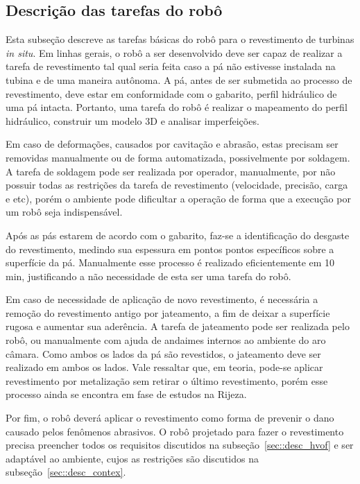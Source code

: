 \subsection{Descrição das tarefas do robô}
\label{desc_taref}
Esta subseção descreve as tarefas básicas do robô para o revestimento de
turbinas \textit{in situ}. Em linhas gerais, o robô a ser desenvolvido deve ser
capaz de realizar a tarefa de revestimento tal qual seria feita caso a pá não estivesse instalada na
tubina e de uma maneira autônoma. A pá, antes de ser submetida ao
processo de revestimento, deve estar em conformidade com o gabarito, perfil hidráulico de uma pá
intacta. Portanto, uma tarefa do robô é realizar o mapeamento do perfil
hidráulico, construir um modelo 3D e analisar imperfeições.

Em caso de deformações, causados por cavitação e abrasão, estas precisam
ser removidas manualmente ou de forma automatizada, possivelmente por
soldagem. A tarefa de soldagem pode
ser realizada por operador, manualmente, por não possuir todas as restrições
da tarefa de revestimento (velocidade, precisão, carga e etc), porém o ambiente
pode dificultar a operação de forma que a execução por um robô seja
indispensável. 

Após as pás estarem de acordo com o gabarito, faz-se a
identificação do desgaste do revestimento, medindo sua espessura em pontos
pontos específicos sobre a superfície da pá. Manualmente esse
processo é realizado eficientemente em 10 min, justificando a não necessidade de
esta ser uma tarefa do robô. 

Em caso de necessidade de aplicação
de novo revestimento, é necessária a remoção do revestimento antigo por
jateamento, a fim de deixar a superfície rugosa e aumentar sua aderência. A
tarefa de jateamento pode ser realizada pelo robô, ou manualmente
com ajuda de andaimes internos ao ambiente do aro câmara. Como ambos os lados da pá são revestidos, o
jateamento deve ser realizado em ambos os lados. Vale ressaltar que, em teoria,
pode-se aplicar revestimento por metalização sem retirar o último revestimento,
porém esse processo ainda se encontra em fase de estudos na Rijeza.

Por fim, o robô deverá aplicar o revestimento como
forma de prevenir o dano causado pelos fenômenos abrasivos. O robô projetado
para fazer o revestimento precisa preencher todos os requisitos discutidos na
subseção~\ref{sec::desc_hvof} e ser adaptável ao ambiente, cujos as restrições
são discutidos na subseção~\ref{sec::desc_contex}. 

